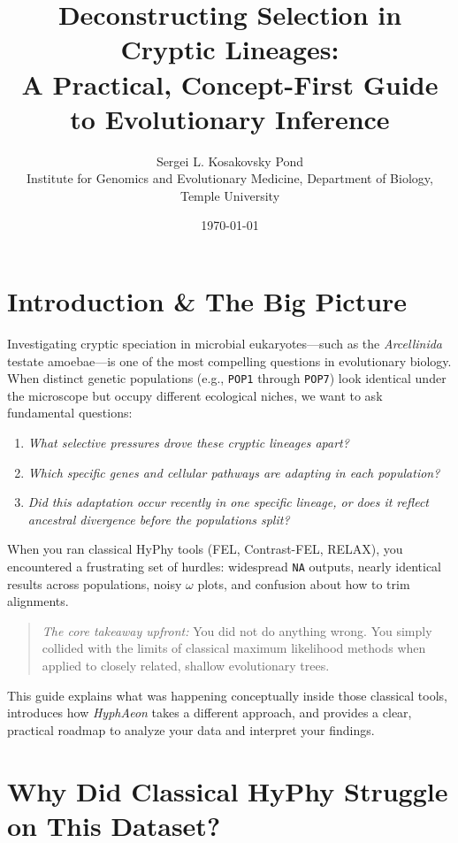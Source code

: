 \documentclass[11pt,a4paper]{article}
\title{\Large \textcolor{hyphablue}{Deconstructing Selection in Cryptic Lineages:}\\A Practical, Concept-First Guide to Evolutionary Inference}
\author{Sergei L. Kosakovsky Pond \\ \small Institute for Genomics and Evolutionary Medicine, Department of Biology, Temple University}
\date{\today}
\begin{document}
\maketitle

\section*{Introduction \& The Big Picture}

Investigating cryptic speciation in microbial eukaryotes---such as the \textit{Arcellinida} testate amoebae---is one of the most compelling questions in evolutionary biology. When distinct genetic populations (e.g., \texttt{POP1} through \texttt{POP7}) look identical under the microscope but occupy different ecological niches, we want to ask fundamental questions:
\begin{enumerate}
    \item \textit{What selective pressures drove these cryptic lineages apart?}
    \item \textit{Which specific genes and cellular pathways are adapting in each population?}
    \item \textit{Did this adaptation occur recently in one specific lineage, or does it reflect ancestral divergence before the populations split?}
\end{enumerate}

When you ran classical HyPhy tools (FEL, Contrast-FEL, RELAX), you encountered a frustrating set of hurdles: widespread \texttt{NA} outputs, nearly identical results across populations, noisy $\omega$ plots, and confusion about how to trim alignments.

\begin{quote}
\textit{The core takeaway upfront:} You did not do anything wrong. You simply collided with the limits of classical maximum likelihood methods when applied to closely related, shallow evolutionary trees.
\end{quote}

This guide explains what was happening conceptually inside those classical tools, introduces how \textit{HyphAeon} takes a different approach, and provides a clear, practical roadmap to analyze your data and interpret your findings.

\section{Why Did Classical HyPhy Struggle on This Dataset?}
\end{document}
